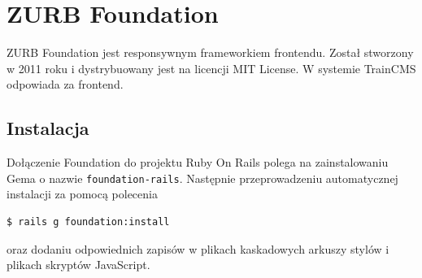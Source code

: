 \documentclass[openright]{xmgr}
\begin{document}
\newpage

\section{ZURB Foundation}
ZURB Foundation \cite{foundation} jest responsywnym frameworkiem frontendu. Został stworzony w 2011 roku i dystrybuowany jest na licencji MIT License. W systemie \mbox{TrainCMS} odpowiada za frontend. 

\subsection{Instalacja}
Dołączenie Foundation do projektu Ruby On Rails polega na zainstalowaniu Gema o nazwie \texttt{foundation-rails}. Następnie przeprowadzeniu automatycznej instalacji za pomocą polecenia 
\begin{lstlisting}[language=bash, caption={Polecenie instalujące Foundation w naszym projekcie}]
$ rails g foundation:install 
\end{lstlisting} 
oraz dodaniu odpowiednich zapisów w plikach kaskadowych arkuszy stylów i plikach skryptów JavaScript.
\end{document}
